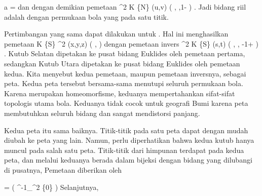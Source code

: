 {\mavergleichskette
{\vergleichskette
{ a
}
{ = }{ {  }
}
{  }{
}
{    }{
}
{   }{
}
}
{}{}{}
dan dengan demikian pemetaan
\maabbeledisp {} { \R^2 } { K \setminus \{N\}
} { (u,v) } { \left(  {  }, {  } ,1- {  }  \right)
} {.}
Jadi bidang riil adalah  dengan permukaan bola yang  pada satu titik.

Pertimbangan yang sama dapat dilakukan untuk . Hal ini menghasilkan pemetaan
\maabbeledisp {\beta} { K \setminus \{S\} } { \R^2
} { (x,y,z) } { \left(  {  }, {  }  \right)
} {}
dengan pemetaan invers
\maabbeledisp {} { \R^2 } { K \setminus \{S\}
} { (s,t) } { \left(  {  }, {  }, -1+ {  }  \right)
} {.}
Kutub Selatan dipetakan ke pusat bidang Euklides oleh pemetaan pertama, sedangkan Kutub Utara dipetakan ke pusat bidang Euklides oleh pemetaan kedua. Kita menyebut kedua pemetaan, maupun pemetaan inversnya, sebagai peta. Kedua peta tersebut bersama-sama menutupi seluruh permukaan bola. Karena merupakan homeomorfisme, keduanya mempertahankan sifat-sifat topologis utama bola. Keduanya tidak cocok untuk geografi Bumi karena peta membutuhkan seluruh bidang dan sangat mendistorsi panjang.

Kedua peta itu sama baiknya. Titik-titik  {} {} pada satu peta dapat dengan mudah diubah ke peta yang lain. Namun, perlu diperhatikan bahwa kedua kutub hanya muncul pada salah satu peta. Titik-titik dari himpunan  terdapat pada kedua peta, dan melalui keduanya berada dalam bijeksi dengan bidang yang dilubangi di pusatnya,  Pemetaan  {}  {} {} diberikan oleh

\mavergleichskette
{\vergleichskette
{ \psi
}
{ = }{ \beta \circ \left(  \alpha^{-1}\!\mid_{\R^2 \setminus \{0\} }  \right)
}
{  }{
}
{    }{
}
{   }{
}
}
{}{}{}
Selanjutnya,

}
